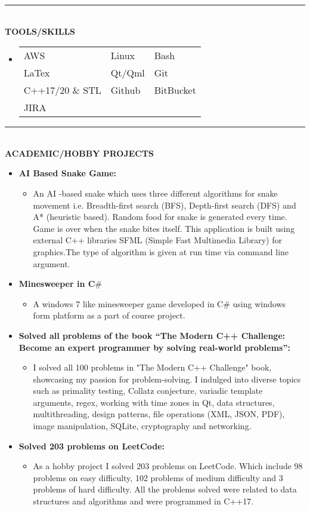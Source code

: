 \documentclass[9pt,a4paper]{article}
\newcommand{\MyHorizontalLine}{\noindent\rule{\linewidth}{1.5pt}\\}
\begin{document}
\MyHorizontalLine
	\textbf{TOOLS/SKILLS}
	\begin{itemize}
	\item[]
		\begin{tabularx}{1.25\linewidth}{XXX}
			AWS & Linux & Bash\\
			LaTex & Qt/Qml & Git\\
			C++17/20 \& STL &  Github & BitBucket\\
			JIRA
		\end{tabularx}
	\end{itemize}
	\MyHorizontalLine
	\textbf{ACADEMIC/HOBBY PROJECTS}
	\begin{itemize}
		\item \textbf{AI Based Snake Game:}
		\begin{itemize}
			\item[]An AI -based snake which uses three different algorithms for snake movement i.e. Breadth-first search (BFS), Depth-first search (DFS) and A* (heuristic based). Random food for snake is generated every time. Game is over when the snake bites itself. This application is built using external C++ libraries SFML (Simple Fast Multimedia Library) for graphics.The type of algorithm is given at run time via command line argument.
		\end{itemize}
		
		\item \textbf{Minesweeper in C$\#$}
		\begin{itemize}
			\item[]A windows 7 like minesweeper game developed in C$\#$ using windows form platform as a part of course project.
		\end{itemize}
		\item \textbf{Solved all problems of the book “The Modern C++ Challenge: Become an expert programmer by solving real-world problems”:}
		\begin{itemize}
			\item[] I solved all 100 problems in "The Modern C++ Challenge" book, showcasing my passion for problem-solving. I indulged into diverse topics such as primality testing, Collatz conjecture, variadic template arguments, regex, working with time zones in Qt, data structures, multithreading, design patterns, file operations (XML, JSON, PDF), image manipulation, SQLite, cryptography and networking.
		\end{itemize}
		
			
		\item \textbf{Solved 203 problems on LeetCode:}
			\begin{itemize}
			\item[]As a hobby project I solved 203 problems on LeetCode. Which include 98 problems on easy difficulty, 102 problems of medium difficulty and 3 problems of hard difficulty. All the problems solved were related to data structures and algorithms and were programmed in C++17.
			\end{itemize}
		

\end{itemize}
\end{document}
